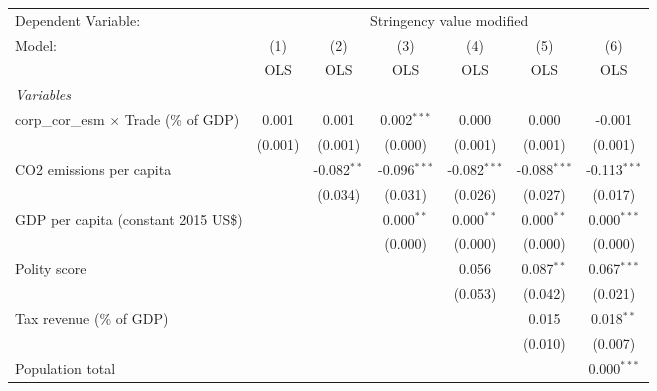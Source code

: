 
\begingroup
\centering
\begin{tabular}{lcccccc}
   \toprule
   Dependent Variable: & \multicolumn{6}{c}{Stringency value modified}\\
   Model:                                        & (1)     & (2)           & (3)            & (4)            & (5)            & (6)\\  
                                                 &  OLS    & OLS           & OLS            & OLS            & OLS            & OLS\\  
   \midrule
   \emph{Variables}\\
   corp\_cor\_esm $\times$ Trade (\% of GDP)     & 0.001   & 0.001         & 0.002$^{***}$  & 0.000          & 0.000          & -0.001\\   
                                                 & (0.001) & (0.001)       & (0.000)        & (0.001)        & (0.001)        & (0.001)\\   
   CO2 emissions per capita                      &         & -0.082$^{**}$ & -0.096$^{***}$ & -0.082$^{***}$ & -0.088$^{***}$ & -0.113$^{***}$\\   
                                                 &         & (0.034)       & (0.031)        & (0.026)        & (0.027)        & (0.017)\\   
   GDP per capita (constant 2015 US\$)           &         &               & 0.000$^{**}$   & 0.000$^{**}$   & 0.000$^{**}$   & 0.000$^{***}$\\   
                                                 &         &               & (0.000)        & (0.000)        & (0.000)        & (0.000)\\   
   Polity score                                  &         &               &                & 0.056          & 0.087$^{**}$   & 0.067$^{***}$\\   
                                                 &         &               &                & (0.053)        & (0.042)        & (0.021)\\   
   Tax revenue (\% of GDP)                       &         &               &                &                & 0.015          & 0.018$^{**}$\\   
                                                 &         &               &                &                & (0.010)        & (0.007)\\   
   Population total                              &         &               &                &                &                & 0.000$^{***}$\\   

\end{tabular}
